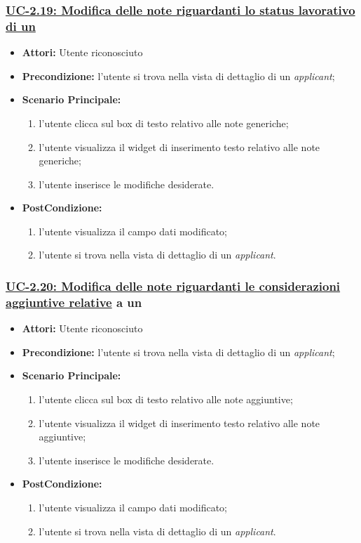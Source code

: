 \subsubsection{\underline{UC-2.19: Modifica delle note riguardanti lo status lavorativo di un \applicant}}
\begin{itemize}
	\item \textbf{Attori:} Utente riconosciuto
	\item \textbf{Precondizione:}  l'utente si trova nella vista di dettaglio di un \textit{applicant};
	\item \textbf{Scenario Principale:}
	\begin{enumerate}
		\item l'utente clicca sul box di testo relativo alle note generiche;
		\item l'utente visualizza il  widget di inserimento testo relativo alle note generiche;
		\item l'utente inserisce le modifiche desiderate.
	\end{enumerate}
	\item \textbf{PostCondizione:} 
	\begin{enumerate}
		\item l'utente visualizza il campo dati modificato;
		\item l'utente si trova nella vista di dettaglio di un \textit{applicant}.
	\end{enumerate}
	
\end{itemize}

\subsubsection{\underline{UC-2.20: Modifica delle note riguardanti le considerazioni aggiuntive relative} a un \applicant}
\begin{itemize}
	\item \textbf{Attori:} Utente riconosciuto
	\item \textbf{Precondizione:}  l'utente si trova nella vista di dettaglio di un \textit{applicant};
	\item \textbf{Scenario Principale:}
	\begin{enumerate}
		\item l'utente clicca sul box di testo relativo alle note aggiuntive;
		\item l'utente visualizza il  widget di inserimento testo relativo alle note aggiuntive;
		\item l'utente inserisce le modifiche desiderate.
	\end{enumerate}
	\item \textbf{PostCondizione:} 
	\begin{enumerate}
		\item l'utente visualizza il campo dati modificato;
		\item l'utente si trova nella vista di dettaglio di un \textit{applicant}.
	\end{enumerate}
	
\end{itemize}



